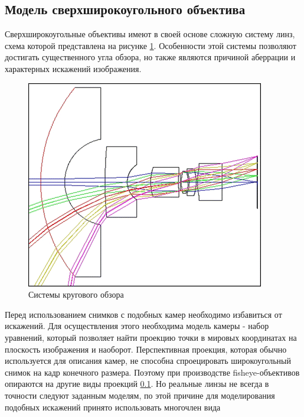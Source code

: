 \subsection{Модель сверхширокоугольного объектива}

Сверхширокоугольные объективы имеют в своей основе сложную систему линз, схема которой представлена на рисунке \ref{pic:fyscheme}. 
Особенности этой системы позволяют достигать существенного угла обзора, но также являются причиной аберрации и характерных искажений 
изображения. 

\begin{figure}[H]
    \begin{center}
        \includegraphics[scale=0.5]{pics/fisheye_scheme.png}                                                                                            %
        \caption{Системы кругового обзора}
        \label{pic:fyscheme}
    \end{center}
\end{figure}
    
Перед использованием снимков с подобных камер необходимо избавиться от искажений. Для осуществления этого необходима модель камеры - 
набор уравнений, который позволяет найти проекцию точки в мировых координатах на плоскость изображения и наоборот. Перспективная проекция, 
которая обычно используется для описания камер, не способна спроецировать широкоугольный снимок на кадр конечного размера. Поэтому при производстве
 fisheye-объективов опираются на другие виды проекций \ref{}. Но реальные линзы не всегда в точности следуют заданным моделям, по этой 
 причине для моделирования подобных искажений принято использовать многочлен вида

